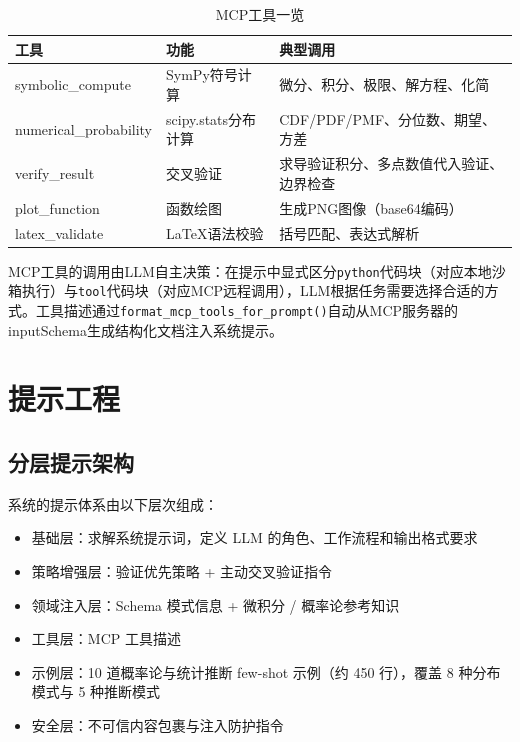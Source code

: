 \documentclass[12pt,a4paper]{ctexart}
\begin{document}
\begin{table}[H]
\centering
\caption{MCP工具一览}
\begin{tabular}{@{}llp{7cm}@{}}
\toprule
\textbf{工具} & \textbf{功能} & \textbf{典型调用} \\
\midrule
symbolic\_compute & SymPy符号计算 & 微分、积分、极限、解方程、化简 \\
numerical\_probability & scipy.stats分布计算 & CDF/PDF/PMF、分位数、期望、方差 \\
verify\_result & 交叉验证 & 求导验证积分、多点数值代入验证、边界检查 \\
plot\_function & 函数绘图 & 生成PNG图像（base64编码） \\
latex\_validate & LaTeX语法校验 & 括号匹配、表达式解析 \\
\bottomrule
\end{tabular}
\end{table}

MCP工具的调用由LLM自主决策：在提示中显式区分\texttt{python}代码块（对应本地沙箱执行）与\texttt{tool}代码块（对应MCP远程调用），LLM根据任务需要选择合适的方式。工具描述通过\texttt{format\_mcp\_tools\_for\_prompt()}自动从MCP服务器的inputSchema生成结构化文档注入系统提示。

\section{提示工程}

\subsection{分层提示架构}

系统的提示体系由以下层次组成：

\begin{itemize}[nosep]
  \item 基础层：求解系统提示词，定义 LLM 的角色、工作流程和输出格式要求
  \item 策略增强层：验证优先策略 + 主动交叉验证指令
  \item 领域注入层：Schema 模式信息 + 微积分 / 概率论参考知识
  \item 工具层：MCP 工具描述
  \item 示例层：10 道概率论与统计推断 few-shot 示例（约 450 行），覆盖 8 种分布模式与 5 种推断模式
  \item 安全层：不可信内容包裹与注入防护指令
\end{itemize}
\end{document}
